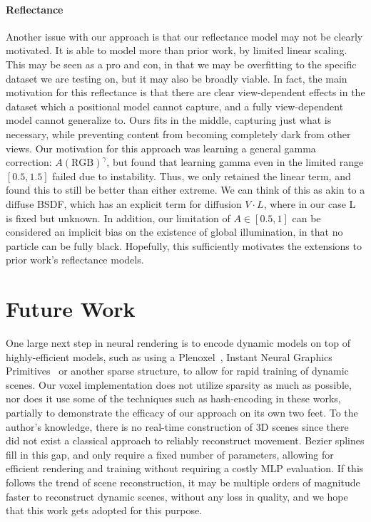 \paragraph{Reflectance}\label{sec:refl_disc} Another issue with our approach is that our reflectance model may not be clearly motivated. It is able to model more than prior work, by limited linear scaling. This may be seen as a pro and con, in that we may be overfitting to the specific dataset we are testing on, but it may also be broadly viable. In fact, the main motivation for this reflectance is that there are clear view-dependent effects in the dataset which a positional model cannot capture, and a fully view-dependent model cannot generalize to. Ours fits in the middle, capturing just what is necessary, while preventing content from becoming completely dark from other views. Our motivation for this approach was learning a general gamma correction: $A (\text{RGB})^\gamma$, but found that learning gamma even in the limited range $[0.5,1.5]$ failed due to instability. Thus, we only retained the linear term, and found this to still be better than either extreme. We can think of this as akin to a diffuse BSDF, which has an explicit term for diffusion $V\cdot L$, where in our case L is fixed but unknown. In addition, our limitation of $A\in[0.5,1]$ can be considered an implicit bias on the existence of global illumination, in that no particle can be fully black. Hopefully, this sufficiently motivates the extensions to prior work's reflectance models.

\section*{Future Work}

One large next step in neural rendering is to encode dynamic models on top of highly-efficient models, such as using a Plenoxel~\cite{yu2021plenoxels}, Instant Neural Graphics Primitives~\cite{mueller2022instant} or another sparse structure, to allow for rapid training of dynamic scenes. Our voxel implementation does not utilize sparsity as much as possible, nor does it use some of the techniques such as hash-encoding in these works, partially to demonstrate the efficacy of our approach on its own two feet. To the author's knowledge, there is no real-time construction of 3D scenes since there did not exist a classical approach to reliably reconstruct movement. Bezier splines fill in this gap, and only require a fixed number of parameters, allowing for efficient rendering and training without requiring a costly MLP evaluation. If this follows the trend of scene reconstruction, it may be multiple orders of magnitude faster to reconstruct dynamic scenes, without any loss in quality, and we hope that this work gets adopted for this purpose.

